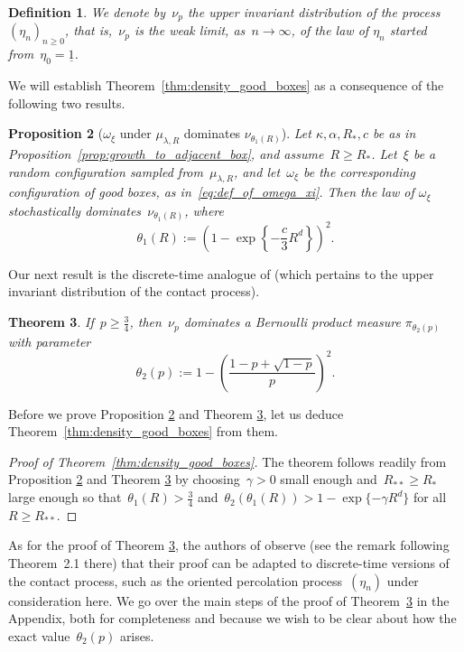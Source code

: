 \documentclass[a4paper,12pt]{article}
\newtheorem  {theorem}       {Theorem}[section]
\newtheorem  {proposition}   [theorem]{Proposition}
\newtheorem  {definition}    [theorem]{Definition}
\begin{document}
\begin{definition}\label{def_cellular_upper_inv}
We denote by~${\nu}_p$ the upper invariant distribution of the process $(\eta_n)_{n \geq 0}$, that is,~${\nu}_p$ is the weak limit, as~$n \to \infty$, of the law of $\eta_n$ started from~$\eta_0 = \underline{1}$.
\end{definition}


We will establish Theorem~\ref{thm:density_good_boxes} as a consequence of the following two results.
\begin{proposition}[$\omega_\xi$ under $\mu_{\lambda,R}$ dominates $\nu_{\theta_1(R)}$]
\label{prop:second_domination} Let $\kappa, \alpha,  R_{*},  c$
  be as in Proposition~\ref{prop:growth_to_adjacent_box}, and assume~$R \ge R_*$. Let~$\xi$ be a random configuration sampled from~$\mu_{\lambda,R}$, and let~$\omega_\xi$ be the corresponding configuration of good boxes, as in~\eqref{eq:def_of_omega_xi}. Then the law of $\omega_\xi$ stochastically dominates~$\nu_{\theta_1(R)}$, where
\begin{equation}\label{theta_1_R_def}
\theta_1(R) := \left(1-\exp\left\{-\frac{c}{3}R^d\right\}\right)^2.
\end{equation}
\end{proposition}

Our next result is the discrete-time analogue of \cite[Theorem 2.1]{LS06} (which pertains to the upper invariant distribution of the contact process).

\begin{theorem}\label{thm:apply_ls}
If~$p \ge \frac34$, then~$\nu_p$ dominates a   Bernoulli product measure $\pi_{\theta_2(p)}$ with parameter
\begin{equation}\label{theta_2_R_def}
\theta_2(p) := 1 - \left(\frac{1-p + \sqrt{1-p}}{p} \right)^2.
 \end{equation}
\end{theorem}
Before we prove Proposition \ref{prop:second_domination} and Theorem \ref{thm:apply_ls}, let us deduce Theorem~\ref{thm:density_good_boxes} from them.
\begin{proof}[Proof of Theorem~\ref{thm:density_good_boxes}]
The theorem follows readily from Proposition \ref{prop:second_domination} and Theorem \ref{thm:apply_ls} by choosing~$\gamma > 0$ small enough and~$R_{**} \geq R_*$ large enough so that~$\theta_1(R) > \frac34$ and~$\theta_2(\theta_1(R)) > 1 - \exp\{-\gamma R^d\}$ for all~$R \ge R_{**}$.
\end{proof}

 As for the proof of Theorem \ref{thm:apply_ls}, the authors of \cite{LS06}  observe (see the remark following Theorem~2.1 there) that their proof can be adapted to discrete-time versions of the contact process, such as the oriented percolation process~$(\eta_n)$ under consideration here. We go over the main steps of the proof of Theorem~\ref{thm:apply_ls} in the Appendix, both for completeness and because we wish to be clear about how the exact value~$\theta_2(p)$  arises.
\end{document}
